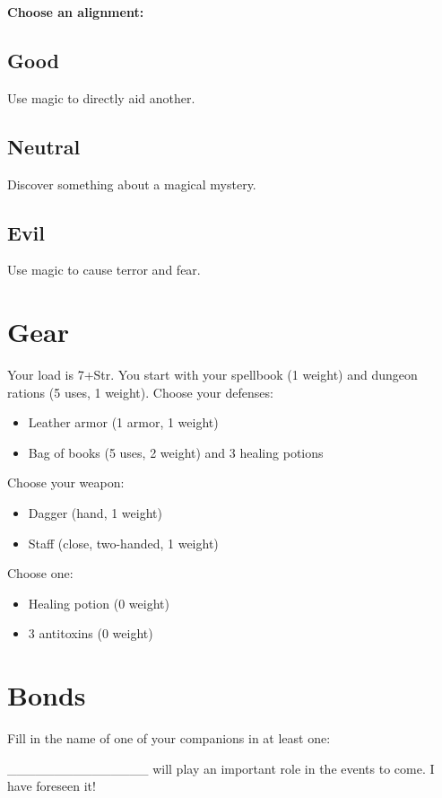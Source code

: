 {\bfseries Choose an alignment:}
\subsection{Good}

Use magic to directly aid another.
\subsection{Neutral}

Discover something about a magical mystery.
\subsection{Evil}

Use magic to cause terror and fear.
\section*{Gear}

Your load is 7+Str. You start with your spellbook (1 weight) and dungeon rations (5 uses, 1 weight). Choose your defenses:
\begin{itemize}
\item Leather armor (1 armor, 1 weight)
\item Bag of books (5 uses, 2 weight) and 3 healing potions

\end{itemize}

Choose your weapon:
\begin{itemize}
\item Dagger (hand, 1 weight)
\item Staff (close, two-handed, 1 weight)

\end{itemize}

Choose one:
\begin{itemize}
\item Healing potion (0 weight)
\item 3 antitoxins (0 weight)

\end{itemize}
\section*{Bonds}

Fill in the name of one of your companions in at least one:

\_\_\_\_\_\_\_\_\_\_\_\_\_\_\_ will play an important role in the events to come. I have foreseen it!

